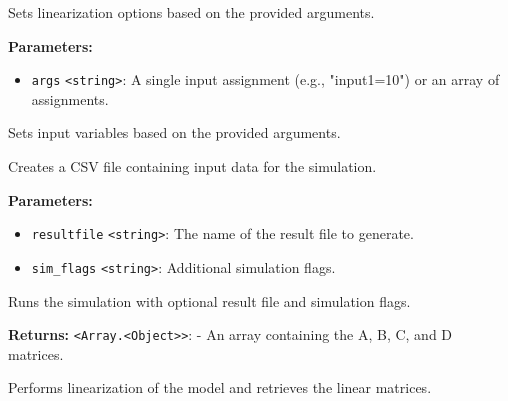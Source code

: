 \documentclass[12pt,a4paper]{article}
\begin{document}
\noindent Sets linearization options based on the provided arguments.

\vspace{5mm}
\noindent {}


\noindent \textbf{Parameters:}
\begin{itemize}
  \item \texttt{args} \texttt{<string>}: A single input assignment (e.g., "input1=10") or an array of assignments.
\end{itemize}

\noindent Sets input variables based on the provided arguments.

\vspace{5mm}
\noindent {}


\noindent Creates a CSV file containing input data for the simulation.

\vspace{5mm}
\noindent {}


\noindent \textbf{Parameters:}
\begin{itemize}
  \item \texttt{resultfile} \texttt{<string>}: The name of the result file to generate.
  \item \texttt{sim\_flags} \texttt{<string>}: Additional simulation flags.
\end{itemize}

\noindent Runs the simulation with optional result file and simulation flags.

\vspace{5mm}
\noindent {}


\noindent \textbf{Returns:} \texttt{<Array.<Object>>}: - An array containing the A, B, C, and D matrices.

\noindent Performs linearization of the model and retrieves the linear matrices.

\vspace{5mm}
\noindent {}
\end{document}
